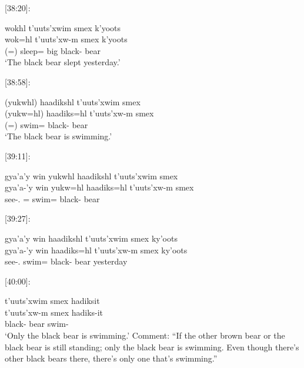[38:20]: 
\begin{exe}
    \ex \glll
    wokhl t'uuts'xwim smex k'yoots \\
    wok=hl  t'uuts'xw-m smex k'yoots  \\
    (\Prog=\Cn) sleep=\Cn{} big black-\Attr{} bear \\
    \glt `The black bear slept yesterday.'
\end{exe}




[38:58]:

\begin{exe}
    \ex \glll
    (yukwhl) haadikshl t'uuts'xwim smex \\
    (yukw=hl) haadiks=hl t'uuts'xw-m smex \\
    (\Prog=\Cn) swim=\Cn{} black-\Attr{} bear \\
    \glt `The black bear is swimming.'
\end{exe}

[39:11]:
\begin{exe}
    \ex \glll
    gya'a'y win yukwhl haadikshl t'uuts'xwim smex  \\
    gya'a-'y win yukw=hl haadiks=hl t'uuts'xw-m smex  \\
    see-\Fsg.\Ii{} \Comp{} \Prog=\Cn{} swim=\Cn{} black-\Attr{} bear \\
\end{exe}

[39:27]:
\begin{exe}
    \ex \glll
    gya'a'y win haadikshl t'uuts'xwim smex ky'oots \\
    gya'a-'y win haadiks=hl t'uuts'xw-m smex ky'oots \\
    see-\Fsg.\Ii{} \Comp{} swim=\Cn{} black-\Attr{} bear yesterday  \\
\end{exe}


[40:00]: 
\begin{exe}
    \ex \glll
    t'uuts'xwim smex hadiksit \\
    t'uuts'xw-m smex hadiks-it \\
    black-\Attr{} bear swim-\Sx \\
    \glt `Only the black bear is swimming.'
    Comment: “If the other brown bear or the black bear is still standing; only the black bear is swimming. Even though there's other black bears there, there's only one that's swimming.”
\end{exe}

